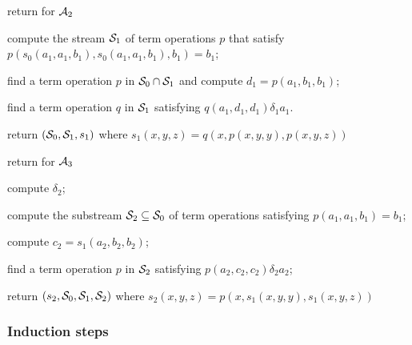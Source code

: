 \LinesNumbered
\begin{algorithm}

  \caption{return \ldto for $\mathcal{A}_2$
  \label{alg:stream-ldt2}  }

compute the stream $\mathcal{S}_1$ of term operations $p$
that satisfy $p(s_0(a_1,a_1,b_1), s_0(a_1,a_1,b_1), b_1) = b_1$;

find a term operation $p$ in $\mathcal{S}_0 \cap \mathcal{S}_1$ and compute $d_1 = p(a_1,b_1,b_1)$;

find a term operation $q$ in $\mathcal{S}_1$ satisfying $q(a_1, d_1, d_1) \mathrel{\delta_1} a_1$.

return $(\mathcal{S}_0, \mathcal{S}_1, s_1)$ where $s_1(x,y,z) = q(x, p(x,y,y), p(x,y,z))$
\end{algorithm}


\LinesNumbered
\begin{algorithm}

  \caption{return \ldto for $\mathcal{A}_3$
  \label{alg:stream-ldt3}  }

compute $\delta_2$;

compute the substream $\mathcal{S}_2 \subseteq \mathcal{S}_0$ of term operations satisfying
 $p(a_1,a_1,b_1) = b_1$;

compute $c_2 = s_1(a_2, b_2, b_2)$;

find a term operation $p$ in $\mathcal{S}_2$ satisfying
$p(a_2, c_2, c_2) \mathrel{\delta_2} a_2$;

return $(s_2, \mathcal{S}_0, \mathcal{S}_1, \mathcal{S}_2)$ where $s_2(x,y,z) = p(x, s_1(x,y,y), s_1(x,y,z))$
\end{algorithm}



















\subsubsection{Induction steps}
\label{sec:induct}

